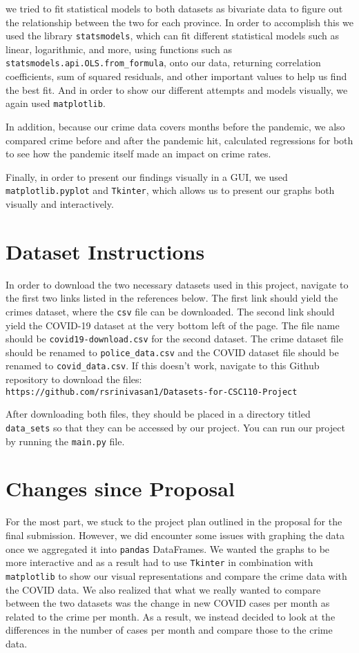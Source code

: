 \documentclass[fontsize=11pt]{article}
\begin{document}
we tried to fit statistical models to both datasets as bivariate data to figure out the relationship between the two for each province. In order to accomplish this we used the library \verb+statsmodels+, which can fit different statistical models such as linear, logarithmic, and more, using functions such as \verb+statsmodels.api.OLS.from_formula+, onto our data, returning correlation coefficients, sum of squared residuals, and other important values to help us find the best fit. And in order to show our different attempts and models visually, we again used \verb+matplotlib+.

In addition, because our crime data covers months before the pandemic, we also compared crime before and after the pandemic hit, calculated regressions for both to see how the pandemic itself made an impact on crime rates.

Finally, in order to present our findings visually in a GUI, we used \verb+matplotlib.pyplot+ and \verb+Tkinter+, which allows us to present our graphs both visually and interactively.

\section{Dataset Instructions}

In order to download the two necessary datasets used in this project, navigate to the first two links listed in the references below. The first link should yield the crimes dataset, where the \verb+csv+ file can be downloaded. The second link should yield the COVID-19 dataset at the very bottom left of the page. The file name should be \verb+covid19-download.csv+ for the second dataset. The crime dataset file should be renamed to \verb+police_data.csv+ and the COVID dataset file should be renamed to \verb+covid_data.csv+. If this doesn’t work, navigate to this Github repository to download the files:\\ \verb+https://github.com/rsrinivasan1/Datasets-for-CSC110-Project+

After downloading both files, they should be placed in a directory titled \verb+data_sets+ so that they can be accessed by our project. You can run our project by running the \verb+main.py+ file.

\section{Changes since Proposal}
For the most part, we stuck to the project plan outlined in the proposal for the final submission. However, we did encounter some issues with graphing the data once we aggregated it into \verb+pandas+ DataFrames. We wanted the graphs to be more interactive and as a result had to use \verb+Tkinter+ in combination with \verb+matplotlib+ to show our visual representations and compare the crime data with the COVID data. We also realized that what we really wanted to compare between the two datasets was the change in new COVID cases per month as related to the crime per month. As a result, we instead decided to look at the differences in the number of cases per month and compare those to the crime data.
\end{document}

